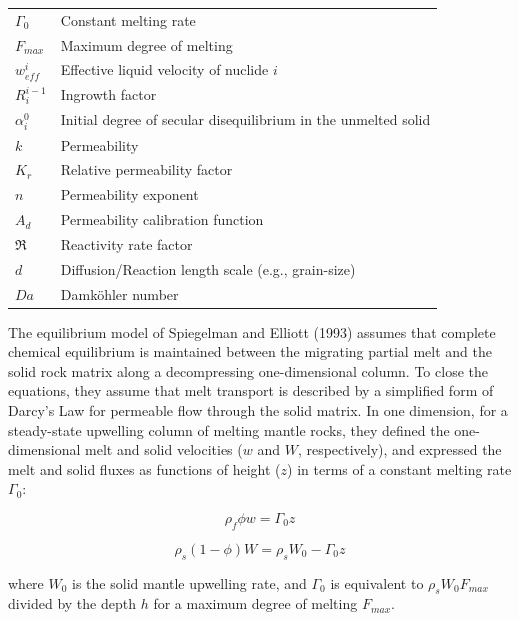 \documentclass[draft]{agujournal2019}
\begin{document}
\begin{table}[H]
\begin{tabular}{l | l}
$\Gamma_0$ & Constant melting rate \\
$F_{max}$ & Maximum degree of melting \\
$w_{eff}^{i}$ & Effective liquid velocity of nuclide $i$ \\
$R_i^{i-1}$ & Ingrowth factor \\
$\alpha_i^0$ & Initial degree of secular disequilibrium in the unmelted solid \\
$k$ & Permeability \\
$K_r$ & Relative permeability factor \\
$n$ & Permeability exponent \\
$A_d$ & Permeability calibration function \\
$\Re$ & Reactivity rate factor \\
$d$ & Diffusion/Reaction length scale (e.g., grain-size) \\
$Da$ & Damk\"{o}hler number \\
\hline
\end{tabular}
\end{table}


The equilibrium model of Spiegelman and Elliott (1993) assumes that complete chemical equilibrium is maintained between the migrating partial melt and the solid rock matrix along a decompressing one-dimensional column. To close the equations, they assume that melt transport is described by a simplified form of Darcy's Law for permeable flow through the solid matrix. In one dimension, for a steady-state upwelling column of melting mantle rocks, they defined the one-dimensional melt and solid velocities ($w$ and $W$, respectively), and expressed the melt and solid fluxes as functions of height ($z$) in terms of a constant melting rate $\Gamma_0$:

\begin{linenomath*}
\begin{equation}
    \rho_f \phi w = \Gamma_0 z\label{eq:2}
\end{equation}
\end{linenomath*}

\begin{linenomath*}
\begin{equation}
    \rho_s (1 - \phi) W = \rho_s W_0 - \Gamma_0 z\label{eq:3}
\end{equation}
\end{linenomath*}

where $W_0$ is the solid mantle upwelling rate, and $\Gamma_0$ is equivalent to $\rho_s W_0 F_{max}$ divided by the depth $h$ for a maximum degree of melting $F_{max}$.
\end{document}

